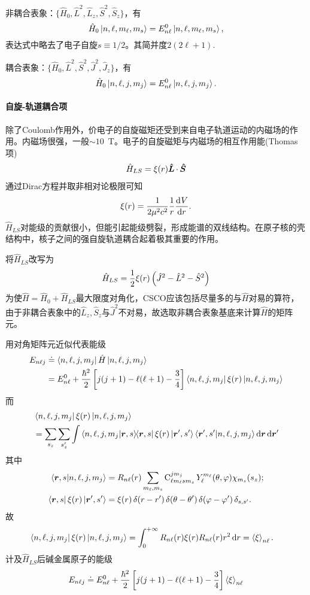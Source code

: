 非耦合表象：$\{\hat H_0,\hat L^2,\hat L_z,\hat S^2,\hat S_z\}$，有 %
\[
	\hat H_0\left\vert n,\ell,m_\ell,m_s\right\rangle=E_{n\ell}^0\left\vert n,\ell,m_\ell,m_s\right\rangle,
\]
表达式中略去了电子自旋$s\equiv 1/2$。其简并度$2(2\ell+1)$.

耦合表象：$\{\hat H_0,\hat L^2,\hat S^2,\hat J^2,\hat J_z\}$，有 
\[
	\hat H_0\left\vert n,\ell,j,m_j\right\rangle=E_{n\ell}^0\left\vert n,\ell,j,m_j\right\rangle.
\]
\paragraph{自旋-轨道耦合项}
除了Coulomb作用外，价电子的自旋磁矩还受到来自电子轨道运动的内磁场的作用。内磁场很强，一般$\sim10$~T。电子的自旋磁矩与内磁场的相互作用能(Thomas项)
\begin{align}
	\hat H_{LS}=\xi(r)\qo L\cdot\,\qo S%
\end{align}
通过Dirac方程并取非相对论极限可知
\[
	\xi(r)=\frac1{2\mu^2c^2}\frac1r\frac{\mathrm{d}^{{}}V}{\mathrm{d}{r}^{{}}}.
\]
$\hat H_{LS}$对能级的贡献很小，但能引起能级劈裂，形成能谱的双线结构。在原子核的壳结构中，核子之间的强自旋轨道耦合起着极其重要的作用。

将$\hat H_{LS}$改写为
\[
	\hat H_{LS}=\frac12\xi(r)\left(\hat J^2-\hat L^2-\hat S^2\right)
\]
为使$\hat H=\hat H_0+\hat H_{LS}$最大限度对角化，CSCO应该包括尽量多的与$\hat H$对易的算符，由于非耦合表象中的$\hat L_z,\hat S_z$与$\hat J^2$不对易，故选取非耦合表象基底来计算$\hat H$的矩阵元。

用对角矩阵元近似代表能级
\begin{align*}
	E_{n\ell j}&\doteq\left\langle n,\ell,j,m_j\right\vert\hat H\left\vert n,\ell,j,m_j\right\rangle\\
	&=E_{n\ell}^0+\frac{\hbar^2}2\left[j(j+1)-\ell(\ell+1)-\frac34\right]\left\langle n,\ell,j,m_j\right\vert\xi(r)\left\vert n,\ell,j,m_j\right\rangle
\end{align*}
而
\begin{align*}
	&\left\langle n,\ell,j,m_j\right\vert\xi(r)\left\vert n,\ell,j,m_j\right\rangle\\
	&=\sum_{s_z}\sum_{s_z'}\int\left\langle n,\ell,j,m_j\middle\vert \bm r,s\right\rangle\hspace{-3pt}\left\langle \bm r,s\right\vert\xi(r)\left\vert \bm r',s'\right\rangle\left\langle \bm r',s'\middle\vert n,\ell,j,m_j\right\rangle\mathop{}\!\mathrm{d}\bm r\mathop{}\!\mathrm{d}\bm r'
\end{align*}
其中 
\begin{align*}
	\left\langle \bm r,s\middle\vert n,\ell,j,m_j\right\rangle&=R_{n\ell}(r)\sum_{m_\ell,m_s}\operatorname{C}_{\ell m_\ell sm_s}^{jm_j}Y_\ell^{m_\ell}(\theta,\varphi)\chi_{m_s}(s_z);\\
	\left\langle \bm r,s\right\vert\xi(r)\left\vert \bm r',s'\right\rangle&=\xi(r)\mathop{}\!\delta(r-r')\mathop{}\!\delta(\theta-\theta')\mathop{}\!\delta(\varphi-\varphi')\mathop{}\!\delta_{s,s'}.
\end{align*}
故
\begin{align*}
	\bra{n,\ell,j,m_j}\xi(r)\ket{n,\ell,j,m_j}&=\int\zti R_{n\ell}(r)\xi(r)R_{n\ell}(r)r^2\d r%
	=\ave\xi_{n\ell}.
\end{align*}
计及$\hat H_{LS}$后碱金属原子的能级
\[
E_{n\ell j}\doteq E_{n\ell}^0+\frac{\hbar^2}2\left[j(j+1)-\ell(\ell+1)-\frac34\right]\left\langle \xi\right\rangle_{n\ell}
\]


